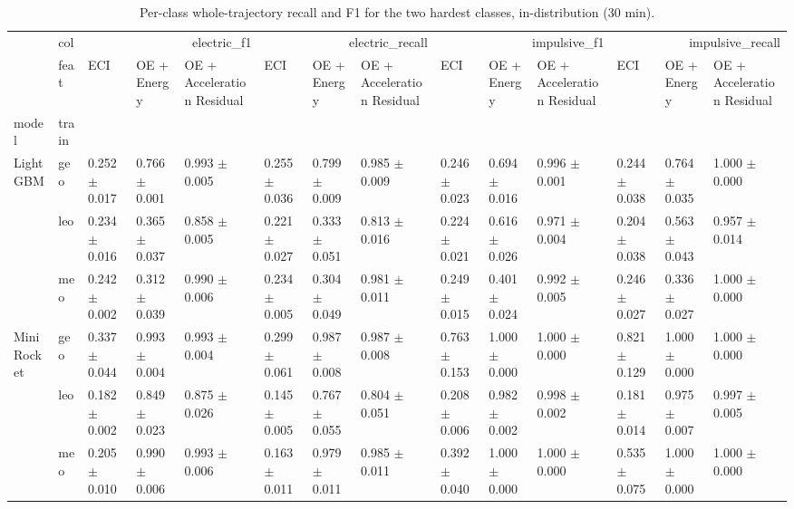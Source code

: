 \begin{table}
\caption{Per-class whole-trajectory recall and F1 for the two hardest classes, in-distribution (30 min).}
\label{tab:total_perclass}
\begin{tabular}{llllllllllllll}
\toprule
 & col & \multicolumn{3}{r}{electric_f1} & \multicolumn{3}{r}{electric_recall} & \multicolumn{3}{r}{impulsive_f1} & \multicolumn{3}{r}{impulsive_recall} \\
 & feat & ECI & OE + Energy & OE + Acceleration Residual & ECI & OE + Energy & OE + Acceleration Residual & ECI & OE + Energy & OE + Acceleration Residual & ECI & OE + Energy & OE + Acceleration Residual \\
model & train &  &  &  &  &  &  &  &  &  &  &  &  \\
\midrule
\multirow[t]{3}{*}{LightGBM} & geo & 0.252 $\pm$ 0.017 & 0.766 $\pm$ 0.001 & 0.993 $\pm$ 0.005 & 0.255 $\pm$ 0.036 & 0.799 $\pm$ 0.009 & 0.985 $\pm$ 0.009 & 0.246 $\pm$ 0.023 & 0.694 $\pm$ 0.016 & 0.996 $\pm$ 0.001 & 0.244 $\pm$ 0.038 & 0.764 $\pm$ 0.035 & 1.000 $\pm$ 0.000 \\
 & leo & 0.234 $\pm$ 0.016 & 0.365 $\pm$ 0.037 & 0.858 $\pm$ 0.005 & 0.221 $\pm$ 0.027 & 0.333 $\pm$ 0.051 & 0.813 $\pm$ 0.016 & 0.224 $\pm$ 0.021 & 0.616 $\pm$ 0.026 & 0.971 $\pm$ 0.004 & 0.204 $\pm$ 0.038 & 0.563 $\pm$ 0.043 & 0.957 $\pm$ 0.014 \\
 & meo & 0.242 $\pm$ 0.002 & 0.312 $\pm$ 0.039 & 0.990 $\pm$ 0.006 & 0.234 $\pm$ 0.005 & 0.304 $\pm$ 0.049 & 0.981 $\pm$ 0.011 & 0.249 $\pm$ 0.015 & 0.401 $\pm$ 0.024 & 0.992 $\pm$ 0.005 & 0.246 $\pm$ 0.027 & 0.336 $\pm$ 0.027 & 1.000 $\pm$ 0.000 \\
\cline{1-14}
\multirow[t]{3}{*}{MiniRocket} & geo & 0.337 $\pm$ 0.044 & 0.993 $\pm$ 0.004 & 0.993 $\pm$ 0.004 & 0.299 $\pm$ 0.061 & 0.987 $\pm$ 0.008 & 0.987 $\pm$ 0.008 & 0.763 $\pm$ 0.153 & 1.000 $\pm$ 0.000 & 1.000 $\pm$ 0.000 & 0.821 $\pm$ 0.129 & 1.000 $\pm$ 0.000 & 1.000 $\pm$ 0.000 \\
 & leo & 0.182 $\pm$ 0.002 & 0.849 $\pm$ 0.023 & 0.875 $\pm$ 0.026 & 0.145 $\pm$ 0.005 & 0.767 $\pm$ 0.055 & 0.804 $\pm$ 0.051 & 0.208 $\pm$ 0.006 & 0.982 $\pm$ 0.002 & 0.998 $\pm$ 0.002 & 0.181 $\pm$ 0.014 & 0.975 $\pm$ 0.007 & 0.997 $\pm$ 0.005 \\
 & meo & 0.205 $\pm$ 0.010 & 0.990 $\pm$ 0.006 & 0.993 $\pm$ 0.006 & 0.163 $\pm$ 0.011 & 0.979 $\pm$ 0.011 & 0.985 $\pm$ 0.011 & 0.392 $\pm$ 0.040 & 1.000 $\pm$ 0.000 & 1.000 $\pm$ 0.000 & 0.535 $\pm$ 0.075 & 1.000 $\pm$ 0.000 & 1.000 $\pm$ 0.000 \\

\end{tabular}
\end{table}
